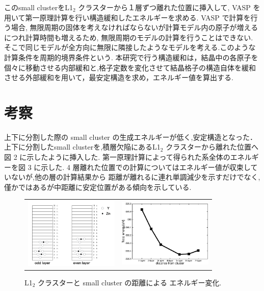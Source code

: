 \documentclass[a4j,twocolumn]{jsarticle}
\begin{document}
このsmall clusterをL1$_2$ クラスターから１層ずつ離れた位置に挿入して, VASP を用いて第一原理計算を行い構造緩和したエネルギーを求める. VASP で計算を行う場合, 無限周期の固体を考えなければならないが計算モデル内の原子が増えるにつれ計算時間も増えるため, 無限周期のモデルの計算を行うことはできない. そこで同じモデルが全方向に無限に隣接したようなモデルを考える.このような計算条件を周期的境界条件という.
本研究で行う構造緩和は，結晶中の各原子を個々に移動させる内部緩和と,格子定数を変化させて結晶格子の構造自体を緩和させる外部緩和を用いて，最安定構造を求め，エネルギー値を算出する.



\section{考察}
上下に分割した際の small cluster の生成エネルギーが低く,安定構造となった．
上下に分割したsmall clusterを,積層欠陥にあるL1$_2$ クラスターから離れた位置へ図 2 に示したように挿入した. 
第一原理計算によって得られた系全体のエネルギーを図 3 に示した. 4 層離れた位置での計算についてはエネルギー値が収束していないが,他の層の計算結果から 距離が離れるに連れ単調減少を示すだけでなく,僅かではあるが中距離に安定位置がある傾向を示している. 



\begin{figure}
    \begin{tabular}{cc}
      \begin{minipage}{0.5\hsize}
        \centering
        \includegraphics[width=45mm]{small_cluster_slab.png}
        \caption{計算モデルの模式図.}
        \label{default}
      \end{minipage} &
      \begin{minipage}{0.5\hsize}
        \centering
        \includegraphics[width=45mm]{small_cluster.eps}
        \caption{L1$_2$ クラスターと small cluster の距離による エネルギー変化.}
        \label{default}
      \end{minipage}
    \end{tabular}
  \end{figure}
\end{document}
